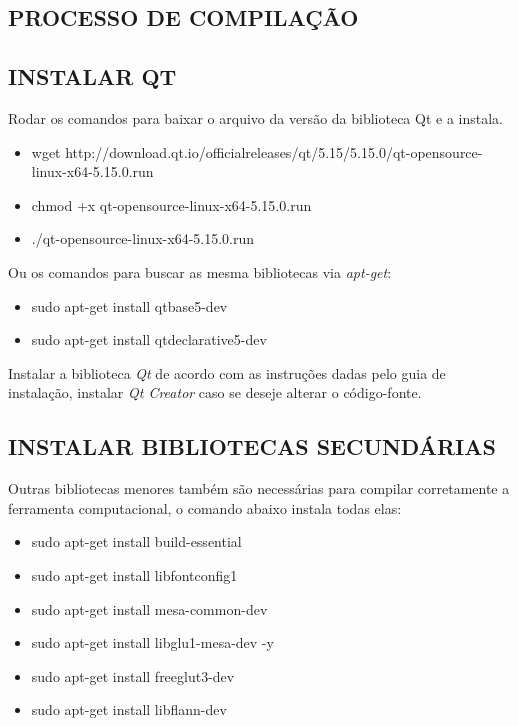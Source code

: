 \begin{appendices}
	\chapter{PROCESSO DE COMPILAÇÃO}\label{annex1}
	\section{INSTALAR QT}\label{qt}
		
		Rodar os comandos para baixar o arquivo da versão da biblioteca Qt e a instala.
		
	\begin{itemize}
		\item wget http://download.qt.io/official\underline{\space\space}releases/qt/5.15/5.15.0/qt-opensource-linux-x64-5.15.0.run
		\item chmod +x qt-opensource-linux-x64-5.15.0.run
		\item ./qt-opensource-linux-x64-5.15.0.run
	\end{itemize}
	
	
	Ou os comandos para buscar as mesma bibliotecas via \textit{apt-get}:
	
	\begin{itemize}
		\item sudo apt-get install qtbase5-dev
		\item sudo apt-get install qtdeclarative5-dev
	\end{itemize}

	Instalar a biblioteca \textit{Qt} de acordo com as instruções dadas pelo guia de instalação, instalar \textit{Qt Creator} caso se deseje alterar o código-fonte.
	
	\section{INSTALAR BIBLIOTECAS SECUNDÁRIAS}\label{secondary_libs}
	
	Outras bibliotecas menores também são necessárias para compilar corretamente a ferramenta computacional, o comando abaixo instala todas elas:
	
	\begin{itemize}
		\item sudo apt-get install build-essential
		\item sudo apt-get install libfontconfig1
		\item sudo apt-get install mesa-common-dev
		\item sudo apt-get install libglu1-mesa-dev -y
		\item sudo apt-get install freeglut3-dev
		\item sudo apt-get install libflann-dev
	\end{itemize}
	

\end{appendices}
